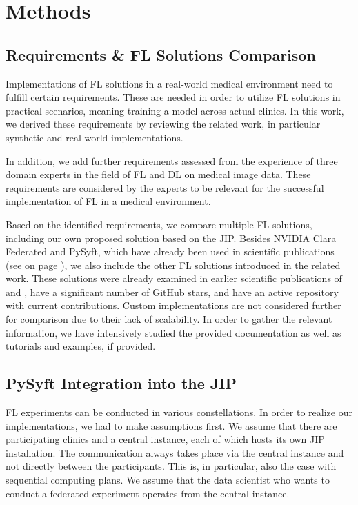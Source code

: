 \section{Methods}
\label{sec:Methods}

\subsection{Requirements \& FL Solutions Comparison}
\label{subsec:MethodsRequirements}

Implementations of FL solutions in a real-world medical environment need to fulfill certain requirements. These are needed in order to utilize FL solutions in practical scenarios, meaning training a model across actual clinics. In this work, we derived these requirements by reviewing the related work, in particular synthetic and real-world implementations.

In addition, we add further requirements assessed from the experience of three domain experts in the field of FL and DL on medical image data. These requirements are considered by the experts to be relevant for the successful implementation of FL in a medical environment.

Based on the identified requirements, we compare multiple FL solutions, including our own proposed solution based on the JIP. Besides NVIDIA Clara Federated and PySyft, which have already been used in scientific publications (see  on page \pageref{subsec:LitRev}), we also include the other FL solutions introduced in the related work. These solutions were already examined in earlier scientific publications of \cite{Li2019AProtection} and \cite{He2020FedML:Learning}, have a significant number of GitHub stars, and have an active repository with current contributions. Custom implementations are not considered further for comparison due to their lack of scalability. In order to gather the relevant information, we have intensively studied the provided documentation as well as tutorials and examples, if provided.



\subsection{PySyft Integration into the JIP}
\label{subsec:MethodsPySyftIntegration}
FL experiments can be conducted in various constellations. In order to realize our implementations, we had to make assumptions first.
We assume that there are participating clinics and a central instance, each of which hosts its own JIP installation. The communication always takes place via the central instance and not directly between the participants. This is, in particular, also the case with sequential computing plans.
We assume that the data scientist who wants to conduct a federated experiment operates from the central instance.

